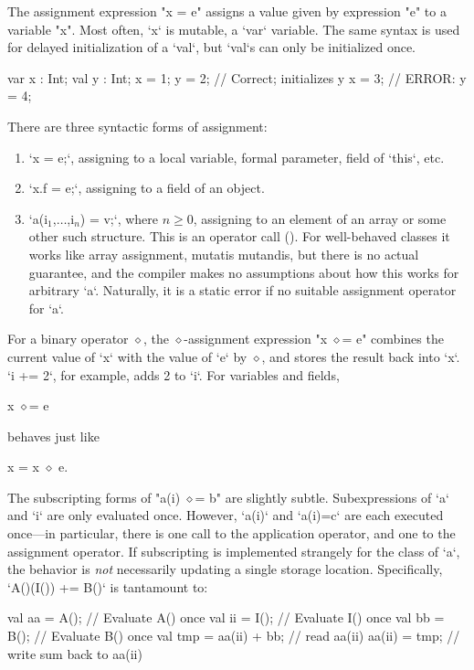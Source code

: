 The assignment expression \xcd"x = e" assigns a value given by
expression \xcd"e"
to a variable \xcd"x".  
Most often, \xcd`x` is mutable, a \xcd`var` variable.  The same syntax is
used for delayed initialization of a \xcd`val`, but \xcd`val`s can only be
initialized once.
\begin{xten}
  var x : Int;
  val y : Int;
  x = 1;
  y = 2; // Correct; initializes y
  x = 3; 
  // ERROR: y = 4;
\end{xten}


There are three syntactic forms of
assignment: 
\begin{enumerate}
\item \xcd`x = e;`, assigning to a local variable, formal parameter, field of
      \xcd`this`, etc. 
\item \xcd`x.f = e;`, assigning to a field of an object.
\item \xcdmath`a(i$_1$,$\ldots$,i$_n$) = v;`, where {$n \ge 0$}, assigning to
      an element of an array or some other such structure. This is an operator
      call ().  For well-behaved classes it works like
      array assignment, mutatis mutandis, but there is no actual guarantee,
      and the compiler makes no assumptions about how this works for arbitrary \xcd`a`.
      Naturally, it is a static error if no suitable assignment operator
      for \xcd`a`.
\end{enumerate}

For a binary operator $\diamond$, the $\diamond$-assignment expression
\xcdmath"x $\diamond$= e" combines the current value of \xcd`x` with the value
of \xcd`e` by {$\diamond$}, and stores the result back into \xcd`x`.  
\xcd`i += 2`, for example, adds 2 to \xcd`i`. For variables and fields, 
\begin{xtenmath}
x $\diamond$= e 
\end{xtenmath}
behaves just like 
\begin{xtenmath}
x = x $\diamond$ e.
\end{xtenmath}

The subscripting forms of \xcdmath"a(i) $\diamond$= b" are slightly subtle.
Subexpressions of \xcd`a` and \xcd`i` are only evaluated once.  However,
\xcd`a(i)` and \xcd`a(i)=c` are each executed once---in particular, there is
one call to the application operator, and one to the assignment operator.
If subscripting is implemented strangely for
the class of \xcd`a`, the behavior is {\em not} necessarily updating a single
storage location. Specifically, \xcd`A()(I()) += B()` is tantamount to: 
\begin{xten}
{
  val aa = A();  // Evaluate A() once
  val ii = I();  // Evaluate I() once
  val bb = B();  // Evaluate B() once
  val tmp = aa(ii) + bb; // read aa(ii)
  aa(ii) = tmp;  // write sum back to aa(ii)
}
\end{xten}

